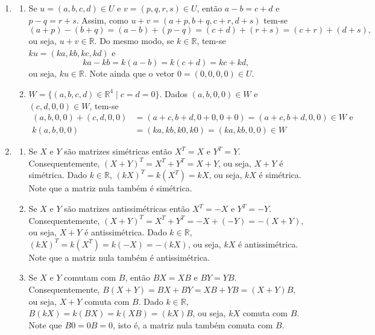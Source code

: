 \documentclass[12pt,a4paper]{article}
\newcommand*\R{\mathbb{R}}
\begin{document}
\begin{enumerate}
\item 
\begin{enumerate}
\item Se $u = (a,b,c,d) \in U$ e $v = (p,q,r,s) \in U$, então $a-b = c+d$ e $p-q = r+s$. Assim, como $u + v = (a+p,b+q,c+r,d+s)$ tem-se
\[
(a+p) - (b+q)
= (a-b) + (p-q)
= (c+d) + (r+s)
= (c+r) + (d+s),
\]
ou seja, $u + v \in \R$. Do mesmo modo, se $k \in \R$, tem-se $k u = (ka, kb, kc, kd)$ e
\[
ka - kb
= k(a-b)
= k(c+d)
= kc+kd,
\]
ou seja, $ku \in \R$. Note ainda que o vetor $0 = (0,0,0,0) \in U$.
\item $W = \{ (a,b,c,d) \in \R^4 \mid c = d = 0 \}$.
Dados $(a,b,0,0) \in W$ e $(c,d,0,0) \in W$, tem-se
\begin{align*}
(a,b,0,0) + (c,d,0,0)
& = (a+c,b+d,0+0,0+0)
  = (a+c,b+d,0,0)
\in W \text{ e} \\
 k( a,  b, 0, 0)
& = (ka, kb, k0, k0)
  = (ka, kb, 0, 0)
\in W
\end{align*}
\end{enumerate}
\item 
\begin{enumerate}
\item Se $X$ e $Y$ são matrizes simétricas então $X^T = X$ e $Y^T = Y$. Consequentemente, $(X+Y)^T = X^T+Y^T = X + Y$, ou seja, $X+Y$ é simétrica. Dado $k \in \R$, $(kX)^T = k(X^T) = kX$, ou seja, $kX$ é simétrica. Note que a matriz nula também é simétrica.

\item Se $X$ e $Y$ são matrizes antissimétricas então $X^T = -X$ e $Y^T = -Y$. Consequentemente, $(X+Y)^T = X^T+Y^T = -X + (-Y) = -(X+Y)$, ou seja, $X+Y$ é antissimétrica. Dado $k \in \R$, $(kX)^T = k(X^T) = k(-X) = -(kX)$, ou seja, $kX$ é antissimétrica. Note que a matriz nula também é antissimétrica.
\item Se $X$ e $Y$ comutam com $B$, então $BX = XB$ e $BY = YB$. Consequentemente, $B(X+Y) = BX+BY = XB + YB = (X+Y)B$, ou seja, $X+Y$ comuta com $B$. Dado $k \in \R$, $B(kX) = k(BX) = k(XB) = (kX)B$, ou seja, $kX$ comuta com $B$. Note que $B0 = 0B = 0$, isto é, a matriz nula também comuta com $B$.


\end{enumerate}
\end{enumerate}
\end{document}
